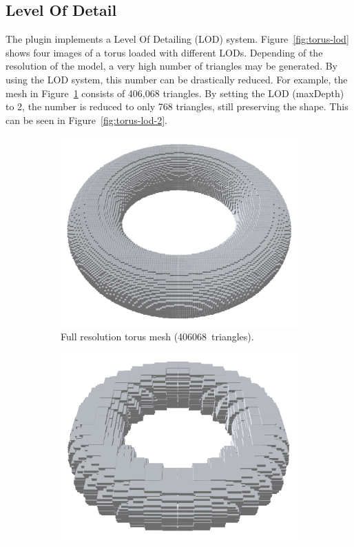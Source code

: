 \subsection{Level Of Detail}
The plugin implements a Level Of Detailing (LOD) system. Figure~\ref{fig:torus-lod} shows four images of a torus loaded with different LODs. Depending of the resolution of the model, a very high number of triangles may be generated. By using the LOD system, this number can be drastically reduced. For example, the mesh in Figure~\ref{fig:torus-lod-10} consists of 406,068 triangles. By setting the LOD (maxDepth) to 2, the number is reduced to only 768 triangles, still preserving the shape. This can be seen in Figure~\ref{fig:torus-lod-2}.
\begin{figure}[htp]
    \centering
    \begin{subfigure}[t]{0.45\textwidth}
        \centering
        \includegraphics[width=\textwidth]{sections/result/figures/torus-lod-10.png}
        \caption{Full resolution torus mesh (406068~triangles).}
        \label{fig:torus-lod-10}
    \end{subfigure}
    \hfill
    \begin{subfigure}[t]{0.45\textwidth}
        \centering
        \includegraphics[width=\textwidth]{sections/result/figures/torus-lod-4.png}

\end{subfigure}
\end{figure}
